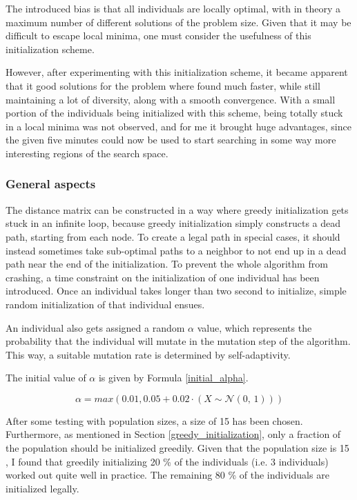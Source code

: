 \documentclass[a4paper,10pt]{article}
\begin{document}
The introduced bias is that all individuals are locally optimal, with in theory a maximum number of different solutions of the problem size. Given that it may be difficult to escape local minima, one must consider the usefulness of this initialization scheme.

However, after experimenting with this initialization scheme, it became apparent that it good solutions for the problem where found much faster, while still maintaining a lot of diversity, along with a smooth convergence. With a small portion of the individuals being initialized with this scheme, being totally stuck in a local minima was not observed, and for me it brought huge advantages, since the given five minutes could now be used to start searching in some way more interesting regions of the search space.

\subsubsection{General aspects}
\label{general_aspects_initialization}
The distance matrix can be constructed in a way where greedy initialization gets stuck in an infinite loop, because greedy initialization simply constructs a dead path, starting from each node. To create a legal path in special cases, it should instead sometimes take sub-optimal paths to a neighbor to not end up in a dead path near the end of the initialization. To prevent the whole algorithm from crashing, a time constraint on the initialization of one individual has been introduced. Once an individual takes longer than two second to initialize, simple random initialization of that individual ensues.

An individual also gets assigned a random $\alpha$ value, which represents the probability that the individual will mutate in the mutation step of the algorithm. This way, a suitable mutation rate is determined by self-adaptivity.

The initial value of $\alpha$ is given by Formula \ref{initial_alpha}.

\begin{equation}
    \label{initial_alpha}
    \alpha = max(0.01, 0.05+0.02 \cdot (X \sim \mathcal{N}(0,\,1)))
\end{equation}

After some testing with population sizes, a size of 15 %
has been chosen. Furthermore, as mentioned in Section \ref{greedy_initialization}, only a fraction of the population should be initialized greedily. Given that the  population size is 15 %
, I found that greedily initializing 20 \% of the individuals (i.e. 3 individuals) worked out quite well in practice. The remaining 80 \% of the individuals are initialized legally.
\end{document}
